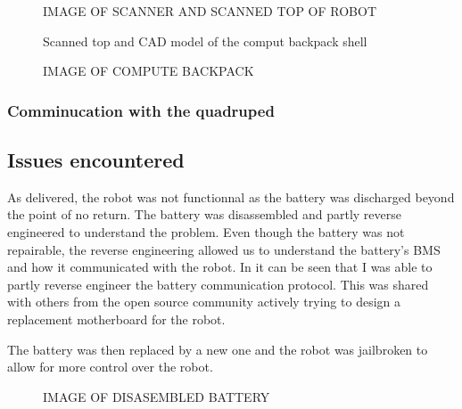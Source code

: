 \documentclass[11pt]{article}
\begin{document}
            \begin{figure}[H]
                \centering
                IMAGE OF SCANNER AND SCANNED TOP OF ROBOT
                \caption{Scanned top and CAD model of the comput backpack shell}
                \label{fig:scanner_and_cad}
            \end{figure}




            \begin{figure}[H]
                \centering
                IMAGE OF COMPUTE BACKPACK
            \end{figure}


            
            \subsubsection{Comminucation with the quadruped}

            
        \subsection{Issues encountered}
            
            As delivered, the robot was not functionnal as the battery was discharged beyond the point of no return. The battery was disassembled and partly reverse engineered to understand the problem. Even though the battery was not repairable, the reverse engineering allowed us to understand the battery's BMS and how it communicated with the robot. In %
            it can be seen that I was able to partly reverse engineer the battery communication protocol. This was shared with others from the open source community actively trying to design a replacement motherboard for the robot. 
            
            The battery was then replaced by a new one and the robot was jailbroken to allow for more control over the robot.
            
            


            \begin{figure}[H]
                \centering
                \color{red} IMAGE OF DISASEMBLED BATTERY
            \end{figure}
\end{document}
